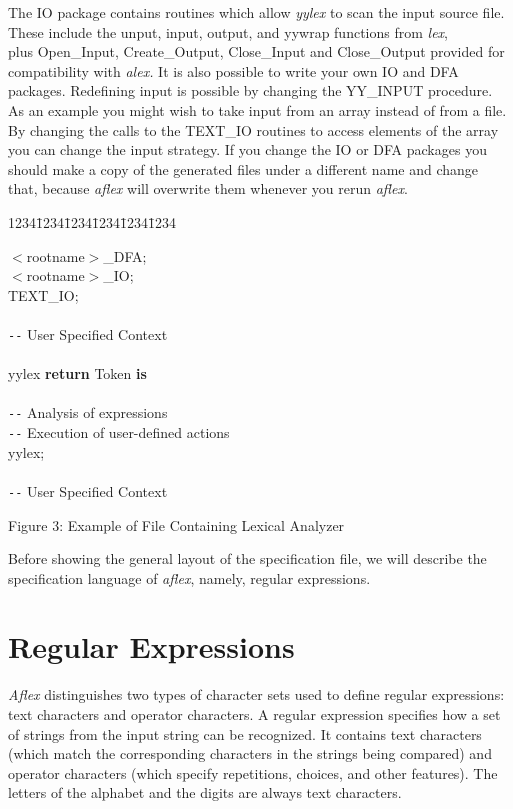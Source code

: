 \mysk
The IO package contains
routines which allow {\sl yylex} to scan the input source file.
These include the unput, input, output, and yywrap functions
from {\it lex},\\
plus Open\_Input, Create\_Output, Close\_Input and Close\_Output
provided for compatibility with {\sl alex.}
\mysk
It is also possible to write your own IO and DFA packages.  Redefining
input is possible by changing the YY\_INPUT procedure.  As an example
you might wish to take input from an array instead of from a file.  By
changing the calls to the TEXT\_IO routines to access elements of the
array you can change the input strategy.  If you change the IO or DFA
packages you should make a copy of the generated files under a
different name and change that, because {\sl aflex} will overwrite
them whenever you rerun {\sl aflex}.

\newpage
\small
\begin{tabbing}
1234\=1234\=1234\=1234\=1234\=1234 \kill

    \>\>     $<$rootname$>$\_DFA; \\
    \>\>     $<$rootname$>$\_IO; \\
    \>\>     TEXT\_IO; \\
\\
    \>\>    \>\verb|--| User Specified Context\\
\\
    \>\>    \>     yylex {\bf return} Token {\bf is} \\
    \>\>    \>     \\
    \>\>    \>    \>    \>\verb|--| Analysis of expressions \\
    \>\>    \>    \>    \>\verb|--| Execution of user-defined actions \\
    \>\>    \>     yylex; \\
\\
    \>\>  \>\verb|--| User Specified Context\\
\end{tabbing}
\centerline{Figure 3: Example of File Containing Lexical Analyzer}

\mysk
Before showing the general layout of the specification file, we will
describe the specification language of {\sl aflex}, namely, regular expressions.


\section{Regular Expressions}
{\sl Aflex} distinguishes two types  of  character  sets  used  to
define regular expressions: text characters and operator characters.
A regular expression specifies how a set of strings from the input
string can be recognized.  It contains text characters  (which  match  the
corresponding characters in  the  strings  being  compared)  and
operator  characters  (which  specify  repetitions, choices, and
other features).  The letters of the alphabet  and  the  digits  are
always text characters.

